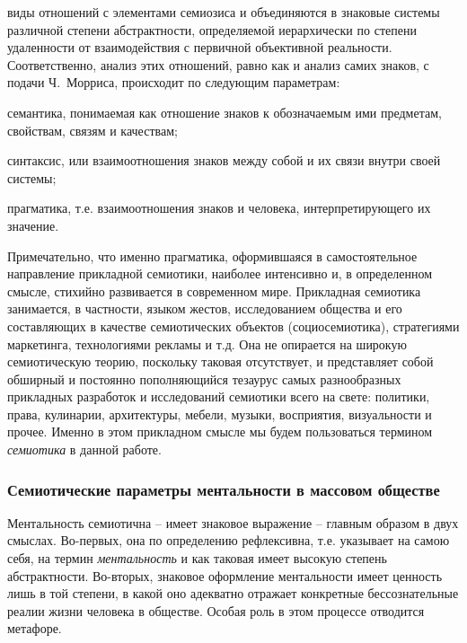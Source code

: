 \begin{enumerate}
  виды отношений с элементами семиозиса и объединяются в знаковые системы различной
  степени абстрактности, определяемой иерархически по степени удаленности от взаимодействия
  с первичной объективной реальности. Соответственно, анализ этих отношений, равно как и анализ
  самих знаков, с подачи Ч.~Морриса, происходит по следующим параметрам:
  \begin{enumerate*}[label=\asbuk*)]
  \item семантика, понимаемая как отношение знаков к обозначаемым ими предметам, свойствам, связям и качествам;
  \item синтаксис, или взаимоотношения знаков между собой и их связи внутри своей системы;
  \item прагматика, т.е. взаимоотношения знаков и человека, интерпретирующего их значение.
  \end{enumerate*}
  Примечательно, что именно прагматика, оформившаяся в самостоятельное направление прикладной
  семиотики, наиболее интенсивно и, в определенном смысле, стихийно развивается в современном мире.
  Прикладная семиотика занимается, в частности, языком жестов, исследованием общества и его
  составляющих в качестве семиотических объектов (социосемиотика), стратегиями маркетинга,
  технологиями рекламы и т.д. Она не опирается на широкую семиотическую теорию, поскольку
  таковая отсутствует, и представляет собой обширный и постоянно пополняющийся тезаурус
  самых разнообразных прикладных разработок и исследований семиотики всего на свете:
  политики, права, кулинарии, архитектуры, мебели, музыки, восприятия, визуальности и прочее.
  Именно в этом прикладном смысле мы будем пользоваться термином \emph{семиотика}
  в данной работе.
\end{enumerate}

\subsubsection{Семиотические параметры ментальности в массовом обществе}\label{1.2}
Ментальность семиотична -- имеет знаковое выражение -- главным образом в двух смыслах.
Во-первых, она по определению рефлексивна, т.е. указывает на самою себя, на термин \emph{ментальность} и
как таковая имеет высокую степень абстрактности. Во-вторых, знаковое оформление ментальности
имеет ценность лишь в той степени, в какой оно адекватно отражает конкретные бессознательные
реалии жизни человека в обществе. Особая роль в этом процессе отводится метафоре. 

